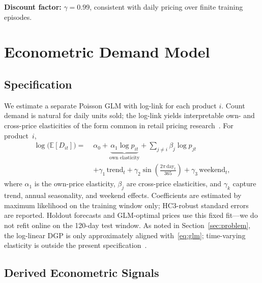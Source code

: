 \documentclass[journal, 10pt, twoside]{IEEEtran}
\begin{document}
\smallskip\noindent\textbf{Discount factor:}
$\gamma = 0.99$, consistent with daily pricing over finite training
episodes.

\section{Econometric Demand Model}
\label{sec:glm}

\subsection{Specification}

We estimate a separate Poisson GLM with log-link for each product
$i$. Count demand is natural for daily units sold; the log-link yields
interpretable own- and cross-price elasticities of the form common in
retail pricing research~\cite{kopalle2023, zhang2025}.
For product~$i$,
\begin{align}
  \log\bigl(\mathbb{E}[D_{it}]\bigr) =\;
  &\alpha_0
  + \underbrace{\alpha_1 \log p_{it}}_{\text{own elasticity}}
  + \sum_{j\neq i}\beta_j \log p_{jt} \nonumber\\
  &+ \gamma_1\,\text{trend}_t
  + \gamma_2\sin\!\!\left(\tfrac{2\pi\,\text{day}_t}{365}\right)
  + \gamma_3\,\text{weekend}_t,
  \label{eq:glm}
\end{align}
where $\alpha_1$ is the own-price elasticity, $\beta_j$ are cross-price
elasticities, and $\gamma_k$ capture trend, annual seasonality, and
weekend effects.
Coefficients are estimated by maximum likelihood on the training
window only; HC3-robust standard errors are reported.
Holdout forecasts and GLM-optimal prices use this fixed fit---we do not
refit online on the 120-day test window.
As noted in Section~\ref{sec:problem}, the log-linear DGP is only
approximately aligned with~\eqref{eq:glm}; time-varying elasticity is
outside the present specification~\cite{zhang2025}.

\subsection{Derived Econometric Signals}
\end{document}
